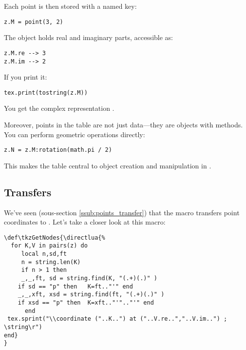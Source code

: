 Each point is then stored with a named key:

\begin{mybox}
\begin{verbatim}
z.M = point(3, 2)
\end{verbatim}
\end{mybox}

The object  holds real and imaginary parts, accessible as:

\begin{verbatim}
z.M.re --> 3
z.M.im --> 2
\end{verbatim}

If you print it:

\begin{verbatim}
tex.print(tostring(z.M))
\end{verbatim}

You get the complex representation .

Moreover, points in the  table are not just data—they are objects with methods. You can perform geometric operations directly:

\begin{verbatim}
z.N = z.M:rotation(math.pi / 2)
\end{verbatim}

This makes the  table central to object creation and manipulation in .

\subsection{Transfers}

We've seen (sous-section \ref{ssub:points_transfer}) that the macro  transfers point coordinates to \TIKZ. Let's take a closer look at this macro:

\vspace*{1em}

\begin{mybox}
\begin{verbatim}
\def\tkzGetNodes{\directlua{%
  for K,V in pairs(z) do
     local n,sd,ft
     n = string.len(K)
     if n > 1 then
     _,_,ft, sd = string.find(K, "(.+)(.)" )
    if sd == "p" then   K=ft.."'" end
    _,_,xft, xsd = string.find(ft, "(.+)(.)" )
    if xsd == "p" then  K=xft.."'".."'" end
      end
 tex.sprint("\\coordinate ("..K..") at ("..V.re..","..V.im..") ; \string\r")
end}
}
\end{verbatim}
\end{mybox}

